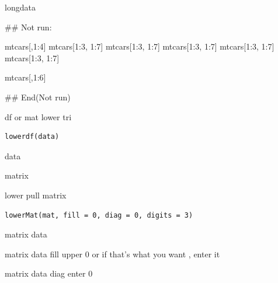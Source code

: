 \documentclass[a4paper]{book}
\begin{document}
%
\begin{Value}
longdata
\end{Value}
%
\begin{Examples}
\begin{ExampleCode}
\#\# Not run: 

mtcars[,1:4] %
mtcars[1:3, 1:7] %
mtcars[1:3, 1:7] %
mtcars[1:3, 1:7] %
mtcars[1:3, 1:7] %
mtcars[1:3, 1:7] %


 mtcars[,1:6] %




## End(Not run)
\end{ExampleCode}
\end{Examples}
%
\begin{Description}
df or mat lower tri
\end{Description}
%
\begin{Usage}
\begin{verbatim}
lowerdf(data)
\end{verbatim}
\end{Usage}
%
\begin{Arguments}
\begin{ldescription}
\item[\code{data}] data
\end{ldescription}
\end{Arguments}
%
\begin{Value}
matrix
\end{Value}
%
\begin{Description}
lower pull matrix
\end{Description}
%
\begin{Usage}
\begin{verbatim}
lowerMat(mat, fill = 0, diag = 0, digits = 3)
\end{verbatim}
\end{Usage}
%
\begin{Arguments}
\begin{ldescription}
\item[\code{mat}] matrix data

\item[\code{fill}] matrix data fill upper 0 or if that's what you want , enter it

\item[\code{diag}] matrix data diag enter 0
\end{ldescription}
\end{Arguments}
\end{document}
